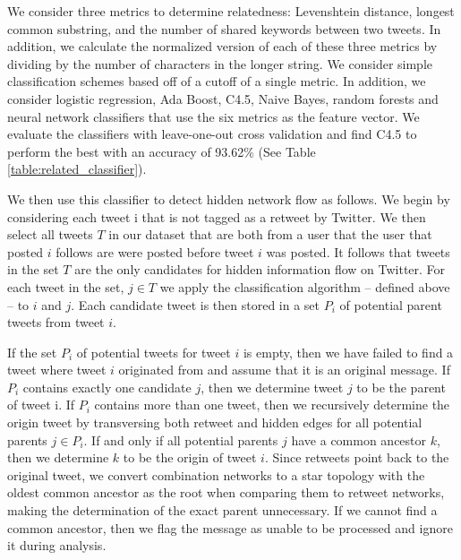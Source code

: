 We consider three metrics to determine relatedness: Levenshtein distance, longest common substring, and the number of shared keywords between two tweets. In addition, we calculate the normalized version of each of these three metrics by dividing by the number of characters in the longer string.  We consider simple classification schemes based off of a cutoff of a single metric. In addition, we consider logistic regression, Ada Boost, C4.5, Naive Bayes, random forests and neural network classifiers that use the six metrics as the feature vector. We evaluate the classifiers with leave-one-out cross validation and find C4.5 to perform the best with an accuracy of 93.62\% (See Table \ref{table:related_classifier}).

	We then use this classifier to detect hidden network flow as follows. We begin by considering each tweet i that is not tagged as a retweet by Twitter. We then select all tweets \(T\) in our dataset that are both from a user that the user that posted \(i\) follows are were posted before tweet \(i\) was posted. It follows that tweets in the set \(T\) are the only candidates for hidden information flow on Twitter. For each tweet in the set, \(j \in T\) we apply the classification algorithm -- defined above -- to \(i\) and \(j\). Each candidate tweet is then stored in a set \(P_i\) of potential parent tweets from tweet \(i\).

	If the set \(P_i\) of potential tweets for tweet \(i\) is empty, then we have failed to find a tweet where tweet \(i\) originated from and assume that it is an original message. If \(P_i\) contains exactly one candidate \(j\), then we determine tweet \(j\) to be the parent of tweet i. If \(P_i\) contains more than one tweet, then we recursively determine the origin tweet by transversing both retweet and hidden edges for all potential parents \(j \in P_i\). If and only if all potential parents \(j\) have a common ancestor \(k\), then we determine \(k\) to be the origin of tweet \(i\). Since retweets point back to the original tweet, we convert combination networks to a star topology with the oldest common ancestor as the root when comparing them to retweet networks, making the determination of the exact parent unnecessary. If we cannot find a common ancestor, then we flag the message as unable to be processed and ignore it during analysis.

